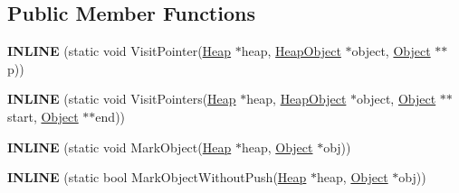 \subsection*{Public Member Functions}
\begin{DoxyCompactItemize}
\item 
{\bfseries I\+N\+L\+I\+NE} (static void Visit\+Pointer(\hyperlink{classv8_1_1internal_1_1_heap}{Heap} $\ast$heap, \hyperlink{classv8_1_1internal_1_1_heap_object}{Heap\+Object} $\ast$object, \hyperlink{classv8_1_1internal_1_1_object}{Object} $\ast$$\ast$p))\hypertarget{classv8_1_1internal_1_1_incremental_marking_marking_visitor_a6df9e59e2363f7d284a4ef7979f95ec5}{}\label{classv8_1_1internal_1_1_incremental_marking_marking_visitor_a6df9e59e2363f7d284a4ef7979f95ec5}

\item 
{\bfseries I\+N\+L\+I\+NE} (static void Visit\+Pointers(\hyperlink{classv8_1_1internal_1_1_heap}{Heap} $\ast$heap, \hyperlink{classv8_1_1internal_1_1_heap_object}{Heap\+Object} $\ast$object,                                                                                                                                   \hyperlink{classv8_1_1internal_1_1_object}{Object} $\ast$$\ast$start, \hyperlink{classv8_1_1internal_1_1_object}{Object} $\ast$$\ast$end))\hypertarget{classv8_1_1internal_1_1_incremental_marking_marking_visitor_a9729190d88f1abc638bad465ab00b275}{}\label{classv8_1_1internal_1_1_incremental_marking_marking_visitor_a9729190d88f1abc638bad465ab00b275}

\item 
{\bfseries I\+N\+L\+I\+NE} (static void Mark\+Object(\hyperlink{classv8_1_1internal_1_1_heap}{Heap} $\ast$heap, \hyperlink{classv8_1_1internal_1_1_object}{Object} $\ast$obj))\hypertarget{classv8_1_1internal_1_1_incremental_marking_marking_visitor_a16adde5a6892bac6294df456f9cfdc33}{}\label{classv8_1_1internal_1_1_incremental_marking_marking_visitor_a16adde5a6892bac6294df456f9cfdc33}

\item 
{\bfseries I\+N\+L\+I\+NE} (static bool Mark\+Object\+Without\+Push(\hyperlink{classv8_1_1internal_1_1_heap}{Heap} $\ast$heap, \hyperlink{classv8_1_1internal_1_1_object}{Object} $\ast$obj))\hypertarget{classv8_1_1internal_1_1_incremental_marking_marking_visitor_af64b296fa23e2673f2665eb6c800f189}{}\label{classv8_1_1internal_1_1_incremental_marking_marking_visitor_af64b296fa23e2673f2665eb6c800f189}

\end{DoxyCompactItemize}
